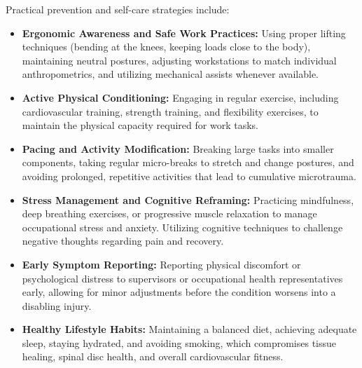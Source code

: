Practical prevention and self-care strategies include:
\begin{itemize}
    \item \textbf{Ergonomic Awareness and Safe Work Practices:} Using proper lifting techniques (bending at the knees, keeping loads close to the body), maintaining neutral postures, adjusting workstations to match individual anthropometrics, and utilizing mechanical assists whenever available.
    \item \textbf{Active Physical Conditioning:} Engaging in regular exercise, including cardiovascular training, strength training, and flexibility exercises, to maintain the physical capacity required for work tasks.
    \item \textbf{Pacing and Activity Modification:} Breaking large tasks into smaller components, taking regular micro-breaks to stretch and change postures, and avoiding prolonged, repetitive activities that lead to cumulative microtrauma.
    \item \textbf{Stress Management and Cognitive Reframing:} Practicing mindfulness, deep breathing exercises, or progressive muscle relaxation to manage occupational stress and anxiety. Utilizing cognitive techniques to challenge negative thoughts regarding pain and recovery.
    \item \textbf{Early Symptom Reporting:} Reporting physical discomfort or psychological distress to supervisors or occupational health representatives early, allowing for minor adjustments before the condition worsens into a disabling injury.
    \item \textbf{Healthy Lifestyle Habits:} Maintaining a balanced diet, achieving adequate sleep, staying hydrated, and avoiding smoking, which compromises tissue healing, spinal disc health, and overall cardiovascular fitness.
\end{itemize}

